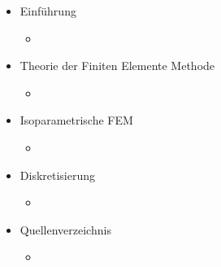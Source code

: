 \documentclass[letterpaper,10pt,german]{jupyterBook}
\begin{document}
\begin{itemize}
\item {} 
\sphinxAtStartPar
Einführung

\begin{itemize}
\item {} 
\sphinxAtStartPar
{\hyperref[\detokenize{chapters/chapter1/Einf_xfchrung_Konstruktion::doc}]{}}

\end{itemize}
\end{itemize}
\begin{itemize}
\item {} 
\sphinxAtStartPar
Theorie der Finiten Elemente Methode

\begin{itemize}
\item {} 
\sphinxAtStartPar
{\hyperref[\detokenize{chapters/chapter2/overview::doc}]{}}

\end{itemize}
\end{itemize}
\begin{itemize}
\item {} 
\sphinxAtStartPar
Isoparametrische FEM

\begin{itemize}
\item {} 
\sphinxAtStartPar
{\hyperref[\detokenize{chapters/chapter3/isoparametrischeFEM::doc}]{}}

\end{itemize}
\end{itemize}
\begin{itemize}
\item {} 
\sphinxAtStartPar
Diskretisierung

\begin{itemize}
\item {} 
\sphinxAtStartPar
{\hyperref[\detokenize{chapters/chapter4/Diskretisierung::doc}]{}}

\end{itemize}
\end{itemize}
\begin{itemize}
\item {} 
\sphinxAtStartPar
Quellenverzeichnis

\begin{itemize}
\item {} 
\sphinxAtStartPar
{\hyperref[\detokenize{quellen::doc}]{}}

\end{itemize}
\end{itemize}
\end{document}
